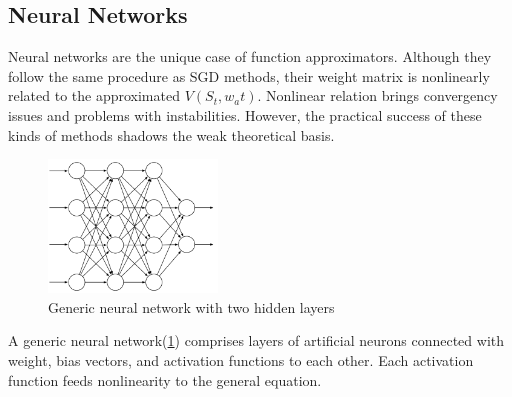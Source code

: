 \subsection{Neural Networks}
Neural networks are the unique case of function approximators. Although they follow the same procedure as SGD methods, their weight matrix is nonlinearly related to the approximated \(V(S_t,w_at)\). Nonlinear relation brings convergency issues and problems with instabilities. However, the practical success of these kinds of methods shadows the weak theoretical basis.

\begin{figure}[htbp]
    \centering
    \includegraphics[width=0.4\textwidth]{figures/nn}
    \caption{Generic neural network with two hidden layers}
    \label{fig:nn}
\end{figure}

A generic neural network(\ref{fig:nn}) comprises layers of artificial neurons connected with weight, bias vectors, and activation functions to each other. Each activation function feeds nonlinearity to the general equation. 

 

 
